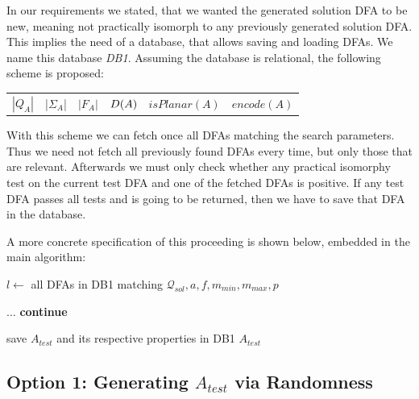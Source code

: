 In our requirements we stated, that we wanted the generated solution DFA to be new, meaning not practically isomorph to any previously generated solution DFA. This implies the need of a database, that allows saving and loading DFAs. We name this database \emph{DB1}. Assuming the database is relational, the following scheme is proposed:
\begin{center}
	\begin{tabular}{c c c c c c}
	$|Q_A|$ & |$\Sigma_A$| & $|F_A|$ & $D(A)$ & $isPlanar(A)$ & $encode(A)$
	\end{tabular}
\end{center}
With this scheme we can fetch once all DFAs matching the search parameters. Thus we need not fetch all previously found DFAs every time, but only those that are relevant. Afterwards we must only check whether any practical isomorphy test on the current test DFA and one of the fetched DFAs is positive. If any test DFA passes all tests and is going to be returned, then we have to save that DFA in the database.

A more concrete specification of this proceeding is shown below, embedded in the main algorithm:
\vspace{0.2cm}
\begin{algorithmic}[1]
	
		\vspace{0.2cm}
	
		\State $l \gets$ all DFAs in DB1 matching $\mathcal{Q}_{sol}, a, f, m_{min}, m_{max}, p$
		
		\vspace{0.2cm}
		
		
		\vspace{0.2cm}
		
			\State $\ldots$
				\State \textbf{continue}
			\EndIf
			
			\vspace{0.2cm}
			
			\State save $A_{test}$ and its respective properties in DB1
			\State\Return $A_{test}$
		\EndWhile
	\EndFunction
\end{algorithmic}
\vspace{0.2cm}

\subsection{Option 1: Generating $A_{test}$ via Randomness}

